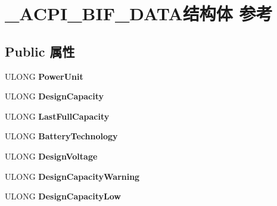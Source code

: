 \hypertarget{struct___a_c_p_i___b_i_f___d_a_t_a}{}\section{\+\_\+\+A\+C\+P\+I\+\_\+\+B\+I\+F\+\_\+\+D\+A\+T\+A结构体 参考}
\label{struct___a_c_p_i___b_i_f___d_a_t_a}
\subsection*{Public 属性}
\begin{DoxyCompactItemize}
\item 
\mbox{\label{struct___a_c_p_i___b_i_f___d_a_t_a_ae33dfb6f31439996749b0171d4008fb6}} 
U\+L\+O\+NG {\bfseries Power\+Unit}
\item 
\mbox{\label{struct___a_c_p_i___b_i_f___d_a_t_a_a7c45dc04f879f12bf0e58defb20512f4}} 
U\+L\+O\+NG {\bfseries Design\+Capacity}
\item 
\mbox{\label{struct___a_c_p_i___b_i_f___d_a_t_a_a708ab80bf6d4f8d78d167b27502559dc}} 
U\+L\+O\+NG {\bfseries Last\+Full\+Capacity}
\item 
\mbox{\label{struct___a_c_p_i___b_i_f___d_a_t_a_ab5033819f53fd19ffcaf91796aa78a8a}} 
U\+L\+O\+NG {\bfseries Battery\+Technology}
\item 
\mbox{\label{struct___a_c_p_i___b_i_f___d_a_t_a_a61ab6ddf5178bd1a3dbcf42116081fea}} 
U\+L\+O\+NG {\bfseries Design\+Voltage}
\item 
\mbox{\label{struct___a_c_p_i___b_i_f___d_a_t_a_ad4017f1092fd5163023a998e575fddb1}} 
U\+L\+O\+NG {\bfseries Design\+Capacity\+Warning}
\item 
\mbox{\label{struct___a_c_p_i___b_i_f___d_a_t_a_a1ad6ae5f12c5ce03231d03c12f487156}} 
U\+L\+O\+NG {\bfseries Design\+Capacity\+Low}
\item 
\mbox{\label{struct___a_c_p_i___b_i_f___d_a_t_a_ac645c00193079f5e67d9021371bc9d21}} 

\end{DoxyCompactItemize}
